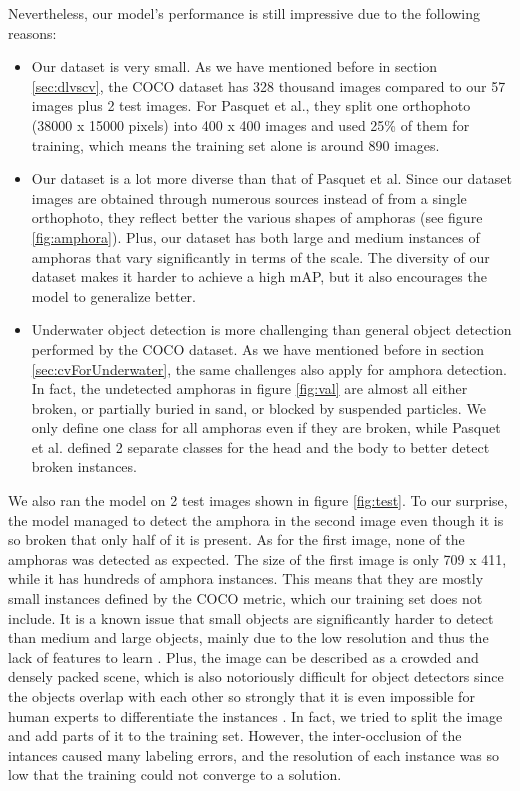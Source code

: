 \documentclass[a4paper, 11pt, oneside]{article}
\begin{document}
  Nevertheless, our model's performance is still impressive due to the following reasons:

  \begin{itemize}
    \item Our dataset is very small. As we have mentioned before in section \ref{sec:dlvscv}, the COCO dataset has 328
    thousand images compared to our 57 images plus 2 test images. For Pasquet et al., they split one orthophoto
    (38000 x 15000 pixels) into 400 x 400 images and used 25\% of them for training, which means the training set
    alone is around 890 images.
    \item Our dataset is a lot more diverse than that of Pasquet et al. Since our dataset images are obtained through
    numerous sources instead of from a single orthophoto, they reflect better the various shapes of amphoras (see
    figure \ref{fig:amphora}). Plus, our dataset has both large and medium instances of amphoras that vary significantly
    in terms of the scale. The diversity of our dataset makes it harder to achieve a high mAP, but it also encourages
    the model to generalize better.
    \item Underwater object detection is more challenging than general object detection performed by the COCO dataset.
    As we have mentioned before in section \ref{sec:cvForUnderwater}, the same challenges also apply for amphora
    detection. In fact, the undetected amphoras in figure \ref{fig:val} are almost all either broken, or partially buried
    in sand, or blocked by suspended particles. We only define one class for all amphoras even if they are broken, while
    Pasquet et al. defined 2 separate classes for the head and the body to better detect broken instances.
  \end{itemize}

  We also ran the model on 2 test images shown in figure \ref{fig:test}. To our surprise, the model managed to detect
  the amphora in the second image even though it is so broken that only half of it is present. As for the first image,
  none of the amphoras was detected as expected. The size of the first image is only 709 x 411, while it has hundreds of
  amphora instances. This means that they are mostly small instances defined by the COCO metric, which our training set
  does not include. It is a known issue that small objects are significantly harder to detect than medium and
  large objects, mainly due to the low resolution and thus the lack of features to learn
  \cite{kisantal2019augmentation, li2017perceptual, eggert2017closer}.
  Plus, the image can be described as a crowded and densely packed scene, which is also notoriously difficult for object
  detectors since the objects overlap with each other so strongly that it is even impossible for human experts to
  differentiate the instances \cite{goldman2019precise, leibe2005pedestrian, arteta2013learning}. In fact, we tried to
  split the image and add parts of it to the training set. However, the inter-occlusion of the intances caused many
  labeling errors, and the resolution of each instance was so low that the training could not converge to a solution.
\end{document}
